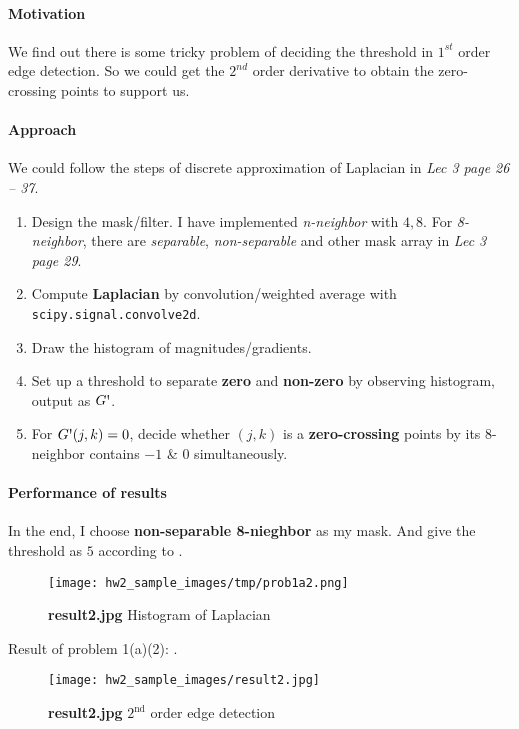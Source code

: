 \paragraph{Motivation}
We find out there is some tricky problem of deciding the threshold in $1^{st}$ order edge detection. So we could get the $2^{nd}$ order derivative to obtain the \alert{zero-crossing} points to support us.

\paragraph{Approach}
We could follow the steps of discrete approximation of Laplacian in \textit{Lec 3 page 26 -- 37}.
\begin{enumerate}
    \item Design the mask/filter. I have implemented \textit{n-neighbor} with \(4, 8\). For \textit{8-neighbor}, there are \textit{separable}, \textit{non-separable} and other mask array in \textit{Lec 3 page 29}.
    \item Compute \textbf{Laplacian} by convolution/weighted average with \texttt{scipy.signal.convolve2d}.
    \item Draw the histogram of magnitudes/gradients.
    \item Set up a threshold to separate \textbf{zero} and \textbf{non-zero} by observing histogram, output as $G\textnormal{\textquotesingle}$.
    \item For $G\textnormal{\textquotesingle}(j, k) = 0$, decide whether $(j, k)$ is a \textbf{zero-crossing} points by its \alert{8-neighbor} contains $-1$ \& $0$ simultaneously.
\end{enumerate}

\paragraph{Performance of results}
In the end, I choose \textbf{non-separable 8-nieghbor} as my mask. And give the threshold as \textbf{\(5\)} according to .
\begin{figure}
    \centering
    \texttt{[image: hw2\_sample\_images/tmp/prob1a2.png]}
    \caption{\textbf{result2.jpg} Histogram of Laplacian}
    \label{prob1a2}
\end{figure}

Result of problem 1(a)(2): .
\begin{figure}
    \centering
    \texttt{[image: hw2\_sample\_images/result2.jpg]}
    \caption{\textbf{result2.jpg} $2^{\mbox{nd}}$ order edge detection}
    \label{result2}
\end{figure}

